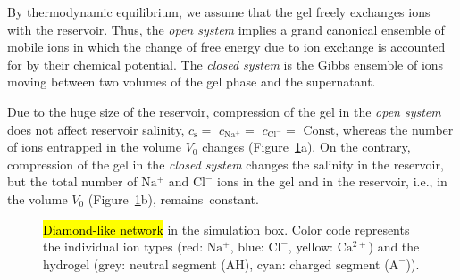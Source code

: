 \documentclass[gels,article,accept,pdftex,moreauthors]{Definitions/mdpi}
\newcommand{\ie}{{i.e.,} }
\newcommand{\cna}{c_\mathrm{Na^+}}
\newcommand{\ccl}{c_\mathrm{Cl^-}}
\newcommand{\A}{\mathrm{A^-}}
\newcommand{\AH}{\mathrm{AH}}
\newcommand{\cl}{\mathrm{Cl^-}}
\newcommand{\na}{\mathrm{Na^+}}
\newcommand{\ca}{\mathrm{Ca^{2+}}}
\newcommand{\cs}{c_{\mathrm{s}}}
\newcommand{\Vbox}{V_0}
\newcommand{\reffig}[1]{Figure~\ref{#1}}
\begin{document}
By thermodynamic equilibrium, we assume that the gel freely exchanges ions with the reservoir.
Thus, the \emph{open system} implies a grand canonical ensemble of mobile ions in which the change of free energy due to ion exchange is accounted for by their chemical potential.
The \emph{closed system} is the Gibbs ensemble of ions moving between two volumes of the gel phase and the supernatant.

Due to the huge size of the reservoir, compression of the gel in the \emph{open system} does not affect reservoir salinity, $\cs =$ $\cna=$ $\ccl=$ $\text{Const}$, whereas the number of ions entrapped in the volume $\Vbox$ changes (\reffig{fig:open and closed}a).
On the contrary, compression of the gel in the \emph{closed system} changes the salinity in the reservoir, but the total number of $\na$ and $\cl$ ions in the gel and in the reservoir, \ie in the volume $\Vbox$ (\reffig{fig:open and closed}b), remains~constant.
\begin{figure}[H]
	{\captionsetup{position=bottom,justification=centering}
	}
	
	\caption{\hl{Diamond-like network} %
 in the simulation box. Color code represents
		the individual ion types (red: $\na$, blue: $\cl$, yellow: $\ca$)
		and the hydrogel (grey: neutral segment ($\AH$), cyan: charged segment
		($\A$)). \label{fig:open and closed}}
\end{figure}
\end{document}
